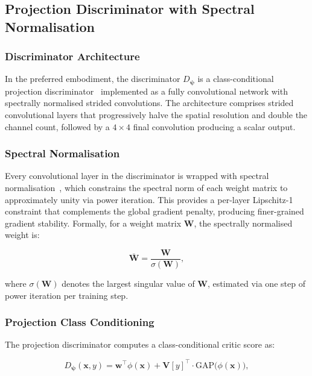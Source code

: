 \documentclass[12pt,letterpaper]{article}
\newcommand{\bx}{\mathbf{x}}
\newcommand{\bw}{\mathbf{w}}
\newcommand{\bpsi}{\bm{\psi}}
\begin{document}
\subsection{Projection Discriminator with Spectral Normalisation}

\subsubsection{Discriminator Architecture}

In the preferred embodiment, the discriminator $D_{\bpsi}$ is a
class-conditional projection discriminator~\cite{miyatokoyama2018}
implemented as a fully convolutional network with spectrally normalised
strided convolutions.  The architecture comprises strided convolutional
layers that progressively halve the spatial resolution and double the
channel count, followed by a $4 \times 4$ final convolution producing a
scalar output.

\subsubsection{Spectral Normalisation}

Every convolutional layer in the discriminator is wrapped with spectral
normalisation~\cite{miyato2018}, which constrains the spectral norm of
each weight matrix to approximately unity via power iteration.  This
provides a per-layer Lipschitz-1 constraint that complements the global
gradient penalty, producing finer-grained gradient stability.  Formally,
for a weight matrix $\mathbf{W}$, the spectrally normalised weight is:

\begin{equation}
  \bar{\mathbf{W}} = \frac{\mathbf{W}}{\sigma(\mathbf{W})},
  \label{eq:sn}
\end{equation}

where $\sigma(\mathbf{W})$ denotes the largest singular value of
$\mathbf{W}$, estimated via one step of power iteration per training step.

\subsubsection{Projection Class Conditioning}

The projection discriminator computes a class-conditional critic score as:

\begin{equation}
  D_{\bpsi}(\bx, y) = \bw^\top \phi(\bx) +
    \mathbf{V}[y]^\top \cdot
    \text{GAP}\!\bigl(\phi(\bx)\bigr),
  \label{eq:proj_disc}
\end{equation}
\end{document}
